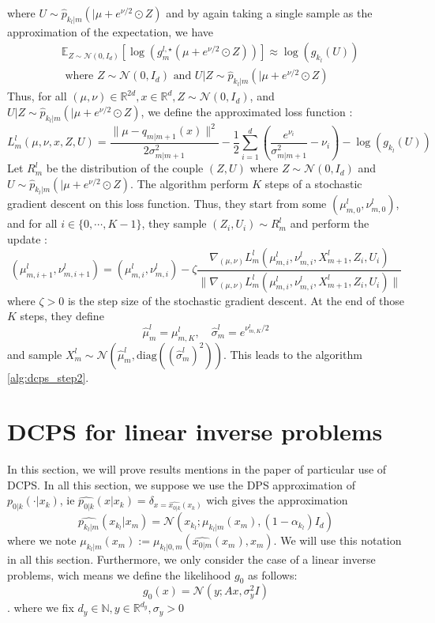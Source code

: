\documentclass[12pt]{article}
\begin{document}
where $U \sim \hat{p}_{k_l|m}(|\mu + e^{\nu/2} \odot Z)$ and by again taking a single sample 
as the approximation of the expectation, we have
\begin{align*}
    &\mathbb{E}_{Z \sim \mathcal{N}(0, I_d)}
\left[ \log(g_m^{l,\star}(\mu + e^{\nu/2} \odot Z)) \right]
 \approx \log(g_{k_l}(U))\\
&\text{ where } Z \sim \mathcal{N}(0, I_d) \text{ and } U|Z \sim \hat{p}_{k_l|m}(|\mu + e^{\nu/2} \odot Z)
\end{align*}
Thus, for all $(\mu, \nu) \in \mathbb{R}^{2d}, x \in \mathbb{R}^d, Z \sim \mathcal{N}(0, I_d)$, and 
$U |Z\sim \hat{p}_{k_l|m}(|\mu + e^{\nu/2} \odot Z)$, we define the approximated loss function :
\begin{equation}
    L^l_m(\mu, \nu, x, Z, U) = \frac{\| \mu - q_{m|m+1}(x)\|^2}{2 \sigma_{m|m+1}^2} 
    - \frac{1}{2}\sum_{i=1}^d \left(\frac{e^{\nu_i}}{\sigma_{m|m+1}^2} - \nu_i \right) 
    - \log(g_{k_l}(U))
\end{equation}
Let $R^l_m$ be the distribution of the couple $(Z, U)$ where $Z \sim \mathcal{N}(0, I_d)$
and $U \sim \hat{p}_{k_l|m}(|\mu + e^{\nu/2} \odot Z)$.
The algorithm perform $K$ steps of a stochastic gradient descent on this loss function.
Thus, they start from some $(\mu^l_{m,0}, \nu^l_{m,0})$, and for all $i \in \{0, \cdots, K-1\}$,
they sample $(Z_{i}, U_{i}) \sim R^l_m$ and perform the update :
\begin{equation}
    (\mu^l_{m,i+1}, \nu^l_{m,i+1}) = 
    (\mu^l_{m,i}, \nu^l_{m,i}) - \zeta \frac{\nabla_{(\mu, \nu)} L^l_m(\mu^l_{m,i}, \nu^l_{m,i}, X^l_{m+1}, Z_{i}, U_{i})}
    {\| \nabla_{(\mu, \nu)} L^l_m(\mu^l_{m,i}, \nu^l_{m,i}, X^l_{m+1}, Z_{i}, U_{i})\|}
\end{equation}
where $\zeta > 0$ is the step size of the stochastic gradient descent.
At the end of those $K$ steps, they define
\begin{equation}
    \hat{\mu}^l_m = \mu^l_{m,K}, \quad
    \hat{\sigma}^l_m = e^{\nu^l_{m,K}/2}
\end{equation}
and sample $X^l_m \sim \mathcal{N}(\hat{\mu}^l_m, \text{diag}((\hat{\sigma}^l_m)^2))$.
This leads to the algorithm \ref{alg:dcps_step2}.
\section{DCPS for linear inverse problems}

In this section, we will prove results mentions in the paper of particular use of DCPS.
In all this section, we suppose we use the DPS approximation of $p_{0|k}(\cdot | x_k)$, ie 
$\hat{p_{0|k}}(x | x_k) = \delta_{x = \hat{x_{0|k}}(x_k)}$ wich gives the approximation
$$\hat{p_{k_l|m}}(x_{k_l} | x_m ) 
= \mathcal{N}\left(x_{k_l}; \mu_{k_l|m}(x_m), (1 - \alpha_{k_l}) I_d \right)$$
where we note $\mu_{k_l|m}(x_m) := \mu_{k_l|0,m}(\hat{x_{0|m}}(x_m),x_m)$. We will use this notation 
in all this section.
Furthermore, we only consider the case of a linear inverse problems, wich means we 
 define the likelihood $g_0$ as follows:
$$g_0(x) = \mathcal{N}(y; Ax, \sigma_y^2 I)$$. where we fix 
$d_y \in \mathbb{N}, y\in \mathbb{R}^{d_y}, \sigma_y > 0$
\end{document}
